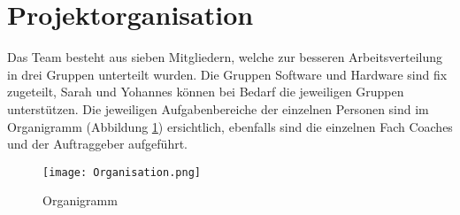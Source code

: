 \section{Projektorganisation}

Das Team besteht aus sieben Mitgliedern, welche zur besseren Arbeitsverteilung in drei Gruppen unterteilt wurden. Die Gruppen Software und Hardware sind fix zugeteilt, Sarah und Yohannes können bei Bedarf die jeweiligen Gruppen unterstützen. Die jeweiligen Aufgabenbereiche der einzelnen Personen sind im Organigramm (Abbildung \ref{fig::Organigramm}) ersichtlich, ebenfalls sind die einzelnen Fach Coaches und der Auftraggeber aufgeführt.

\begin{figure}[h] 

\centering
\texttt{[image: Organisation.png]}%
\caption{Organigramm}%
\label{fig::Organigramm}%
\end{figure}